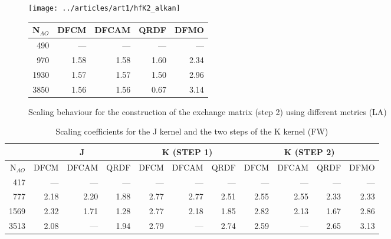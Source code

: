 %
\begin{figure}
\begin{minipage}{0.5\textwidth}
\centering
\texttt{[image: ../articles/art1/hfK2\_alkan]}
\end{minipage}
\begin{minipage}{0.3\textwidth}
\centering
\begin{tabular}{rrrrr}
\hline
N$_{AO}$ & DFCM & DFCAM & QRDF & DFMO \\ \hline
490 & --- & --- & --- & --- \\ 
970 & 1.58 & 1.58 & 1.60 & 2.34 \\ 
1930 & 1.57 & 1.57 & 1.50 & 2.96 \\ 
3850 & 1.56 & 1.56 & 0.67 & 3.14 \\ \hline
\end{tabular}
\end{minipage}
\caption{Scaling behaviour for the construction of the exchange matrix (step 2) using different metrics (LA)}
\label{fig:GS_DFK2SCALE_LA}
\end{figure}


\begin{table}
\footnotesize
\begin{tabular}{r|rrr|rrr|rrrr}
\hline
 & \multicolumn{3}{c}{J} & \multicolumn{3}{c}{K (STEP 1)} &   \multicolumn{4}{c}{K (STEP 2)} \\ \hline
N$_{AO}$ & DFCM & DFCAM & QRDF & DFCM & DFCAM & QRDF & DFCM & DFCAM & QRDF & DFMO \\ \hline
417 & --- & --- & --- & --- & --- & --- & --- & --- & --- & --- \\ 
777 & 2.18 & 2.20 & 1.88 & 2.77 & 2.77 & 2.51 & 2.55 & 2.55 & 2.33 & 2.33 \\ 
1569 & 2.32 & 1.71 & 1.28 & 2.77 & 2.18 & 1.85 & 2.82 & 2.13 & 1.67 & 2.86 \\ 
3513 & 2.08 & --- & 1.94 & 2.79 & --- & 2.74 & 2.59 & --- & 2.65 & 3.13 \\ \hline
\end{tabular}
\caption{Scaling coefficients for the J kernel and the two steps of the K kernel (FW)}
\label{tab:GS_DFJKSCALE_FW}
\end{table}

